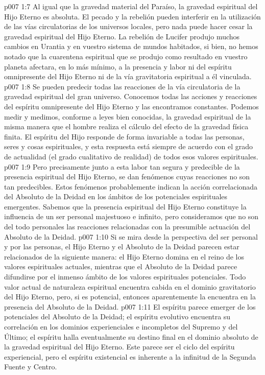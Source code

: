 \vs p007 1:7 \pc Al igual que la gravedad material del Paraíso, la gravedad espiritual del Hijo Eterno es absoluta. El pecado y la rebelión pueden interferir en la utilización de las vías circulatorias de los universos locales, pero nada puede hacer cesar la gravedad espiritual del Hijo Eterno. La rebelión de Lucifer produjo muchos cambios en Urantia y en vuestro sistema de mundos habitados, si bien, no hemos notado que la cuarentena espiritual que se produjo como resultado en vuestro planeta afectara, en lo más mínimo, a la presencia y labor ni del espíritu omnipresente del Hijo Eterno ni de la vía gravitatoria espiritual a él vinculada.
\vs p007 1:8 \pc Se pueden predecir todas las reacciones de la vía circulatoria de la gravedad espiritual del gran universo. Conocemos todas las acciones y reacciones del espíritu omnipresente del Hijo Eterno y las encontramos constantes. Podemos medir y medimos, conforme a leyes bien conocidas, la gravedad espiritual de la misma manera que el hombre realiza el cálculo del efecto de la gravedad física finita. El espíritu del Hijo responde de forma invariable a todas las personas, seres y cosas espirituales, y esta respuesta está siempre de acuerdo con el grado de actualidad (el grado cualitativo de realidad) de todos esos valores espirituales.
\vs p007 1:9 Pero precisamente junto a esta labor tan segura y predecible de la presencia espiritual del Hijo Eterno, se dan fenómenos cuyas reacciones no son tan predecibles. Estos fenómenos probablemente indican la acción correlacionada del Absoluto de la Deidad en los ámbitos de los potenciales espirituales emergentes. Sabemos que la presencia espiritual del Hijo Eterno constituye la influencia de un ser personal majestuoso e infinito, pero consideramos que no son del todo personales las reacciones relacionadas con la presumible actuación del Absoluto de la Deidad.
\vs p007 1:10 \pc Si se mira desde la perspectiva del ser personal y por las personas, el Hijo Eterno y el Absoluto de la Deidad parecen estar relacionados de la siguiente manera: el Hijo Eterno domina en el reino de los valores espirituales actuales, mientras que el Absoluto de la Deidad parece difundirse por el inmenso ámbito de los valores espirituales potenciales. Todo valor actual de naturaleza espiritual encuentra cabida en el dominio gravitatorio del Hijo Eterno, pero, si es potencial, entonces aparentemente la encuentra en la presencia del Absoluto de la Deidad.
\vs p007 1:11 El espíritu parece emerger de los potenciales del Absoluto de la Deidad; el espíritu evolutivo encuentra su correlación en los dominios experienciales e incompletos del Supremo y del Último; el espíritu halla eventualmente su destino final en el dominio absoluto de la gravedad espiritual del Hijo Eterno. Este parece ser el ciclo del espíritu experiencial, pero el espíritu existencial es inherente a la infinitud de la Segunda Fuente y Centro.
